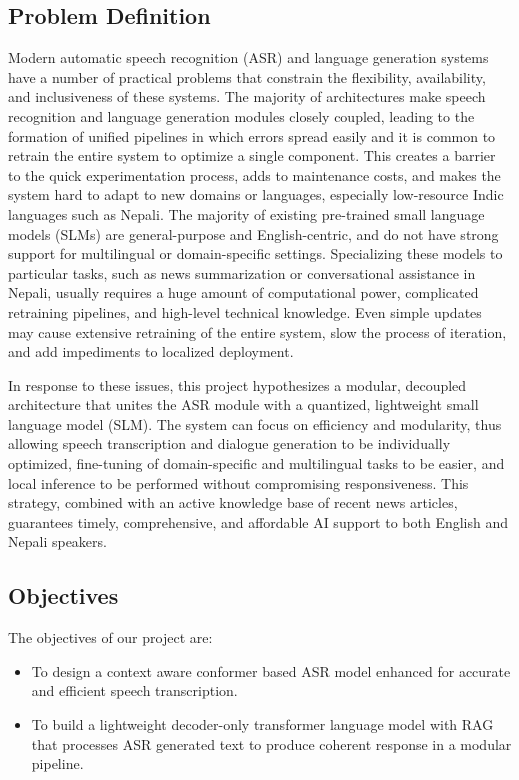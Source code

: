\subsection{Problem Definition}
Modern automatic speech recognition (ASR) and language generation systems have a number of practical problems that constrain the flexibility, availability, and inclusiveness of these systems. The majority of architectures make speech recognition and language generation modules closely coupled, leading to the formation of unified pipelines in which errors spread easily and it is common to retrain the entire system to optimize a single component. This creates a barrier to the quick experimentation process, adds to maintenance costs, and makes the system hard to adapt to new domains or languages, especially low-resource Indic languages such as Nepali. The majority of existing pre-trained small language models (SLMs) are general-purpose and English-centric, and do not have strong support for multilingual or domain-specific settings. Specializing these models to particular tasks, such as news summarization or conversational assistance in Nepali, usually requires a huge amount of computational power, complicated retraining pipelines, and high-level technical knowledge. Even simple updates may cause extensive retraining of the entire system, slow the process of iteration, and add impediments to localized deployment.

In response to these issues, this project hypothesizes a modular, decoupled architecture that unites the ASR module with a quantized, lightweight small language model (SLM). The system can focus on efficiency and modularity, thus allowing speech transcription and dialogue generation to be individually optimized, fine-tuning of domain-specific and multilingual tasks to be easier, and local inference to be performed without compromising responsiveness. This strategy, combined with an active knowledge base of recent news articles, guarantees timely, comprehensive, and affordable AI support to both English and Nepali speakers.

\subsection{Objectives}
The objectives of our project are: 
\begin{itemize}
    \item To design a context aware conformer based ASR model enhanced for accurate and efficient speech transcription.
    \item To build a lightweight decoder-only transformer language model with RAG that processes ASR generated text to produce coherent response in a modular pipeline.
\end{itemize}


